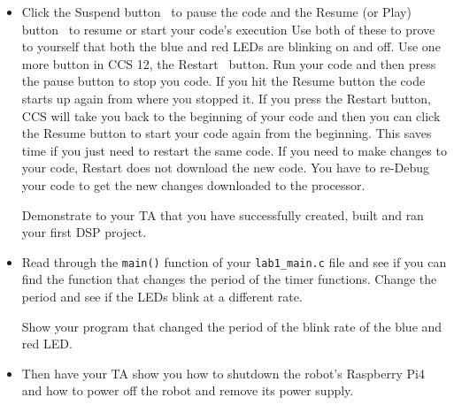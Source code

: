 \documentclass[11pt]{article}
\begin{document}
\begin{itemize}
    \item Click the Suspend button \pauseBtn\ to pause the code and the Resume (or Play) button \playBtn\ to resume or start your code’s execution Use both of these to prove to yourself that both the blue and red LEDs are blinking on and off. Use one more button in CCS 12, the Restart \restartBtn\ button. Run your code and then press the pause button to stop you code. If you hit the Resume button the code starts up again from where you stopped it. If you press the Restart button, CCS will take you back to the beginning of your code and then you can click the Resume button to start your code again from the beginning. This saves time if you just need to restart the same code. If you need to make changes to your code, Restart does not download the new code. You have to re-Debug your code to get the new changes downloaded to the processor.
        \begin{checkoff}
                Demonstrate to your TA that you have successfully created, built and ran your first DSP project.
        \end{checkoff}
        \item Read through the \texttt{main()} function of your \lstinline|lab1_main.c| file and see if you can find the function that changes the period of the timer functions. Change the period and see if the LEDs blink at a different rate.
        \begin{checkoff}
                Show your program that changed the period of the blink rate of the blue and red LED.
        \end{checkoff}
    \item Then have your TA show you how to shutdown the robot’s Raspberry Pi4 and how to power off the robot and remove its power supply.
\end{itemize}
%
\Ex
%
\end{document}

